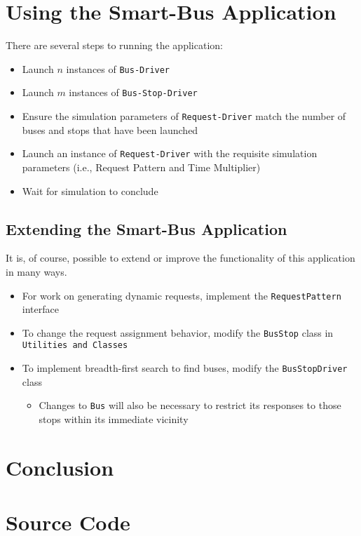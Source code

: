 \documentclass[runningheads]{llncs}
\begin{document}
\section{Using the Smart-Bus Application}
There are several steps to running the application:
\begin{itemize}
	\item Launch $n$ instances of \lstinline{Bus-Driver}
	\item Launch $m$ instances of \lstinline{Bus-Stop-Driver}
	\item Ensure the simulation parameters of \lstinline{Request-Driver} match the number of buses and stops that have been launched
	\item Launch an instance of \lstinline{Request-Driver} with the requisite simulation parameters (i.e., Request Pattern and Time Multiplier)
	\item Wait for simulation to conclude
\end{itemize} 

\subsection{Extending the Smart-Bus Application}
It is, of course, possible to extend or improve the functionality of this application in many ways.
\begin{itemize}
	\item For work on generating dynamic requests, implement the \lstinline{RequestPattern} interface 
	\item To change the request assignment behavior, modify the \lstinline{BusStop} class in \lstinline{Utilities and Classes}
	\item To implement breadth-first search to find buses, modify the \lstinline{BusStopDriver} class
	\begin{itemize}
		\item Changes to \lstinline{Bus} will also be necessary to restrict its responses to those stops within its immediate vicinity
	\end{itemize}
\end{itemize}

\section{Conclusion}

\newpage
\appendix
\section{Source Code}

% 
\end{document}
